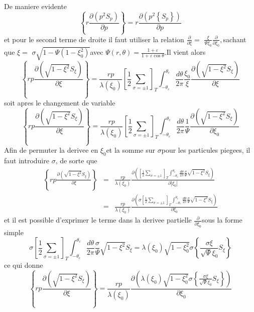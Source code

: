 De maniere evidente \[
\left\{ r\frac{\partial\left(p^{2}S_{p}\right)}{\partial p}\right\} =r\frac{\partial\left(p^{2}\left\{ S_{p}\right\} \right)}{\partial p}\]
 et pour le second terme de droite il faut utiliser la relation $\frac{\partial}{\partial\xi}=$
$\frac{\xi}{\Psi\xi_{0}}\frac{\partial}{\partial\xi_{0}},$sachant
que $\xi=$ $\sigma\sqrt{1-\Psi\left(1-\xi_{0}^{2}\right)}$avec $\Psi\left(r,\theta\right)=\frac{1+\varepsilon}{1+\varepsilon\cos\theta}.$Il
vient alors \[
\left\{ rp\frac{\partial\left(\sqrt{1-\xi^{2}}S_{\xi}\right)}{\partial\xi}\right\} =\frac{rp}{\lambda\left(\xi_{0}\right)}\left[\frac{1}{2}\sum_{\sigma=\pm1}\right]_{T}\int_{-\theta_{c}}^{\theta_{c}}\frac{d\theta}{2\pi}\frac{\xi_{0}}{\xi}\frac{\partial\left(\sqrt{1-\xi^{2}}S_{\xi}\right)}{\partial\xi}\]
 soit apres le changement de variable \[
\left\{ rp\frac{\partial\left(\sqrt{1-\xi^{2}}S_{\xi}\right)}{\partial\xi}\right\} =\frac{rp}{\lambda\left(\xi_{0}\right)}\left[\frac{1}{2}\sum_{\sigma=\pm1}\right]_{T}\int_{-\theta_{c}}^{\theta_{c}}\frac{d\theta}{2\pi}\frac{1}{\Psi}\frac{\partial\left(\sqrt{1-\xi^{2}}S_{\xi}\right)}{\partial\xi_{0}}\]
 Afin de permuter la derivee en $\xi_{0}$et la somme sur $\sigma$pour
les particules piegees, il faut introduire $\sigma$, de sorte que
\begin{eqnarray*}
\left\{ rp\frac{\partial\left(\sqrt{1-\xi^{2}}S_{\xi}\right)}{\partial\xi}\right\}  & = & \frac{rp}{\lambda\left(\xi_{0}\right)}\frac{\partial\left(\left[\frac{1}{2}\sum_{\sigma=\pm1}\right]_{T}\int_{-\theta_{c}}^{\theta_{c}}\frac{d\theta}{2\pi}\frac{\sigma}{\Psi}\sqrt{1-\xi^{2}}S_{\xi}\right)}{\partial\left|\xi_{0}\right|}\\
 & = & \frac{rp}{\lambda\left(\xi_{0}\right)}\frac{\partial\left(\sigma\left[\frac{1}{2}\sum_{\sigma=\pm1}\right]_{T}\int_{-\theta_{c}}^{\theta_{c}}\frac{d\theta}{2\pi}\frac{\sigma}{\Psi}\sqrt{1-\xi^{2}}S_{\xi}\right)}{\partial\xi_{0}}\end{eqnarray*}
 et il est possible d'exprimer le terme dans la derivee partielle
$\frac{\partial}{\partial\xi_{0}}$sous la forme simple \[
\sigma\left[\frac{1}{2}\sum_{\sigma=\pm1}\right]_{T}\int_{-\theta_{c}}^{\theta_{c}}\frac{d\theta}{2\pi}\frac{\sigma}{\Psi}\sqrt{1-\xi^{2}}S_{\xi}=\lambda\left(\xi_{0}\right)\sqrt{1-\xi_{0}^{2}}\sigma\left\{ \frac{\sigma\xi}{\sqrt{\Psi}\xi_{0}}S_{\xi}\right\} \]
 ce qui donne \[
\left\{ rp\frac{\partial\left(\sqrt{1-\xi^{2}}S_{\xi}\right)}{\partial\xi}\right\} =\frac{rp}{\lambda\left(\xi_{0}\right)}\frac{\partial\left(\lambda\left(\xi_{0}\right)\sqrt{1-\xi_{0}^{2}}\sigma\left\{ \frac{\sigma\xi}{\sqrt{\Psi}\xi_{0}}S_{\xi}\right\} \right)}{\partial\xi_{0}}\]


